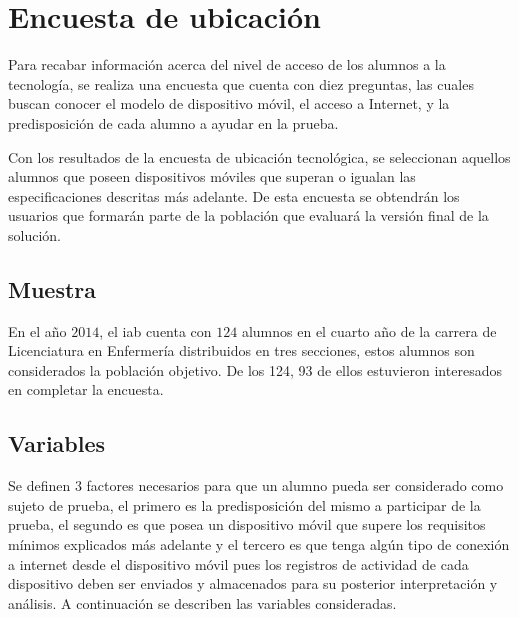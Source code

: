 
\section{Encuesta de ubicación}
\label{sec:ubicacion}

Para recabar información acerca del nivel de acceso  de los alumnos a la
tecnología, se realiza una encuesta que cuenta con diez preguntas, las cuales
buscan conocer el modelo de dispositivo móvil, el acceso a
Internet, y la predisposición de cada alumno a ayudar en la prueba.

Con los resultados de la encuesta de ubicación tecnológica, se seleccionan
aquellos alumnos que poseen dispositivos móviles que superan o igualan las
especificaciones descritas más adelante. De esta encuesta se obtendrán los 
usuarios que formarán parte de la población que evaluará la versión final de 
la solución.

\subsection{Muestra}

En el año $2014$, el \Gls{iab} cuenta con $124$ alumnos en el cuarto año  de la 
carrera de Licenciatura en Enfermería distribuidos en
tres secciones, estos alumnos son considerados la población objetivo. De los 124, 93 de
ellos estuvieron interesados en completar la encuesta.

\subsection{Variables}

Se definen $3$ factores necesarios para que un alumno pueda ser considerado como
sujeto de prueba, el primero es la predisposición del mismo a participar de la
prueba, el segundo es que posea un dispositivo móvil que supere los requisitos
mínimos explicados más adelante y el tercero es que tenga algún tipo de conexión a 
internet desde el dispositivo móvil pues 
los registros de actividad de cada dispositivo deben ser enviados y almacenados 
para su posterior interpretación y análisis. A continuación se describen las variables 
consideradas.


